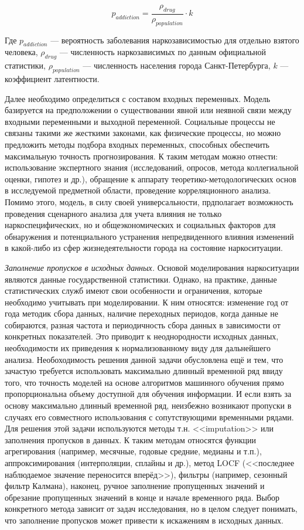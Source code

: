 \begin{equation}
    p_{addiction} = \frac{\rho_{drug}}{\rho_{population}}\cdot k
\end{equation}

Где \(p_{addiction}\) --- вероятность заболевания наркозависимостью для отдельно
взятого человека, \(\rho_{drug}\) --- численность наркозависимых по данным
официальной статистики, \(\rho_{population}\) --- численность населения города
Санкт-Петербурга, \(k\) --- коэффициент латентности.

Далее необходимо определиться с составом входных переменных. Модель базируется
на предположении о существовании явной или неявной связи между входными
переменными и выходной переменной. Социальные процессы не связаны такими же
жесткими законами, как физические процессы, но можно предложить методы подбора
входных переменных, способных обеспечить максимальную точность прогнозирования.
К таким методам можно отнести: использование экспертного знания (исследований,
опросов, метода коллегиальной оценки, гипотез и др.), обращение к аппарату
теоретико-методологических основ в исследуемой предметной области, проведение
корреляционного анализа. Помимо этого, модель, в силу своей универсальности,
прдполагает возможность проведения сценарного анализа для учета влияния не
только наркоспецифических, но и общеэкономических и социальных факторов для
обнаружения и потенциального устранения непредвиденного влияния изменений в
какой-либо из сфер жизнедеятельности города на состояние наркоситуации.

\textit{Заполнение пропусков в исходных данных.} Основой моделирования
наркоситуации являются данные государственной статистики.  Однако, на практике,
данные статистических служб имеют свои особенности и ограничения, которые
необходимо учитывать при моделировании. К ним относятся: изменение год от года
методик сбора данных, наличие переходных периодов, когда данные не собираются,
разная частота и периодичность сбора данных в зависимости от конкретных
показателей. Это приводит к неоднородности исходных данных, необходимости их
приведения к нормализованному виду для дальнейшего анализа.  Необоходимость
решения данной задачи обусловлена ещё и тем, что зачастую требуется использовать
максимально длинный временной ряд ввиду того, что точность моделей на основе
алгоритмов машинного обучения прямо пропорциональна объему доступной для
обучения информации. И если взять за основу максимально длинный временной ряд,
неизбежно возникают пропуски в случаях его совместного использования с
сопутствующими временными рядами.  Для решения этой задачи используются методы
т.н. <<imputation>> или заполнения пропусков в данных. К таким методам относятся
функции агрегирования (например, месячные, годовые средние, медианы и т.п.),
аппроксимирования (интерполяции, сплайны и др.), метод LOCF (<<последнее
наблюдаемое значение переносится вперёд>>), фильтры (например, сезонный фильтр
Калмана), наконец, ручное заполнение пропущенных значений и обрезание
пропущенных значений в конце и начале временного ряда. Выбор конкретного метода
зависит от задач исследования, но в целом следует понимать, что заполнение
пропусков  может привести к искажениям в исходных данных.

